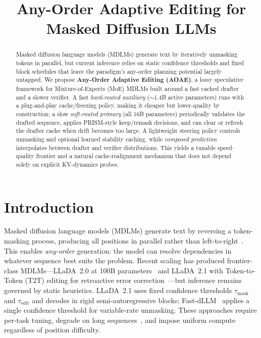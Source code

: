 \documentclass[11pt]{article}
\title{Any-Order Adaptive Editing for Masked Diffusion LLMs}
\author{}
\date{}
\begin{document}
\maketitle

\begin{abstract}
Masked diffusion language models (MDLMs) generate text by iteratively unmasking tokens in parallel, but current inference relies on static confidence thresholds and fixed block schedules that leave the paradigm's any-order planning potential largely untapped.
We propose \textbf{Any-Order Adaptive Editing (AOAE)}, a lossy speculative framework for Mixture-of-Experts (MoE) MDLMs built around a fast cached drafter and a slower verifier.
A fast \emph{hard-routed auxiliary} (${\sim}$1.4B active parameters) runs with a plug-and-play cache/freezing policy, making it cheaper but lower-quality by construction; a slow \emph{soft-routed primary} (all 16B parameters) periodically validates the drafted sequence, applies PRISM-style keep/remask decisions, and can clear or refresh the drafter cache when drift becomes too large.
A lightweight steering policy controls unmasking and optional learned stability caching, while \emph{composed prediction} interpolates between drafter and verifier distributions. This yields a tunable speed--quality frontier and a natural cache-realignment mechanism that does not depend solely on explicit KV-dynamics probes.
\end{abstract}

\section{Introduction}
\label{sec:intro}

Masked diffusion language models (MDLMs) generate text by reversing a token-masking process, producing all positions in parallel rather than left-to-right~\cite{austin2021structured,sahoo2024simple,shi2024simplified,lou2024discrete}.
This enables \emph{any-order} generation: the model can resolve dependencies in whatever sequence best suits the problem.
Recent scaling has produced frontier-class MDLMs---LLaDA~2.0 at 100B parameters~\cite{nie2025llada2} and LLaDA~2.1 with Token-to-Token (T2T) editing for retroactive error correction~\cite{llada21}---but inference remains governed by static heuristics.
LLaDA~2.1 uses fixed confidence thresholds $\tau_{\text{mask}}$ and $\tau_{\text{edit}}$ and decodes in rigid semi-autoregressive blocks; Fast-dLLM~\cite{wu2025fastdllm} applies a single confidence threshold for variable-rate unmasking.
These approaches require per-task tuning, degrade on long sequences~\cite{jazbec2025learning}, and impose uniform compute regardless of position difficulty.
\end{document}
